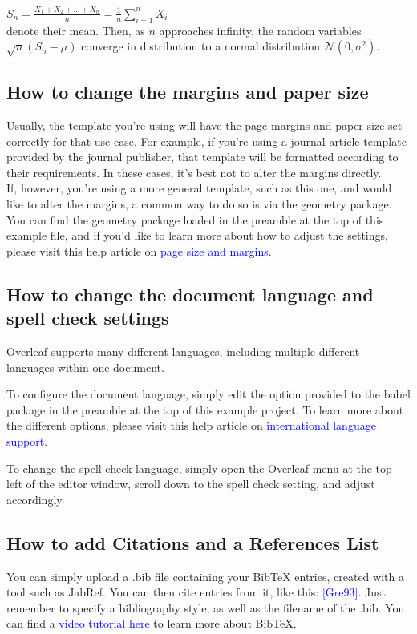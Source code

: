 \documentclass{article}
\begin{document}
$S_n = \frac{X_1 + X_2 + \ldots + X_n}{n} = \frac{1}{n} \sum_{i=1}^{n} X_i$\\

denote their mean. Then, as $n$ approaches infinity, the random variables $\sqrt{n}(S_n - \mu)$ converge in distribution to a normal distribution $\mathcal{N}(0, \sigma^2)$.
\subsection{How to change the margins and paper size}
Usually, the template you’re using will have the page margins and paper size set correctly for that use-case. For example, if you’re using a journal article template provided by the journal publisher, that template will be formatted according to their requirements. In these cases, it’s best not to alter the margins directly.\\

If, however, you’re using a more general template, such as this one, and would like to alter the margins, a common way to do so is via the geometry package. You can find the geometry package loaded in the preamble at the top of this example file, and if you’d like to learn more about how to adjust the settings, please visit this help article on \textcolor{blue}{ page size and margins}.

\subsection{How to change the document language and spell check settings}
Overleaf supports many different languages, including multiple different languages within one document.

To configure the document language, simply edit the option provided to the babel package in the preamble at the top of this example project. To learn more about the different options, please visit this help article on \textcolor{blue}{ international language support}.

To change the spell check language, simply open the Overleaf menu at the top left of the editor window, scroll down to the spell check setting, and adjust accordingly.

\subsection{How to add Citations and a References List}
You can simply upload a .bib file containing your BibTeX entries, created with a tool such as JabRef. You can then cite entries from it, like this:\textcolor{blue}{ [Gre93]}. Just remember to specify a bibliography style, as well as the filename of the .bib. You can find a  \textcolor{blue}{video tutorial here} to learn more about BibTeX.
\end{document}
